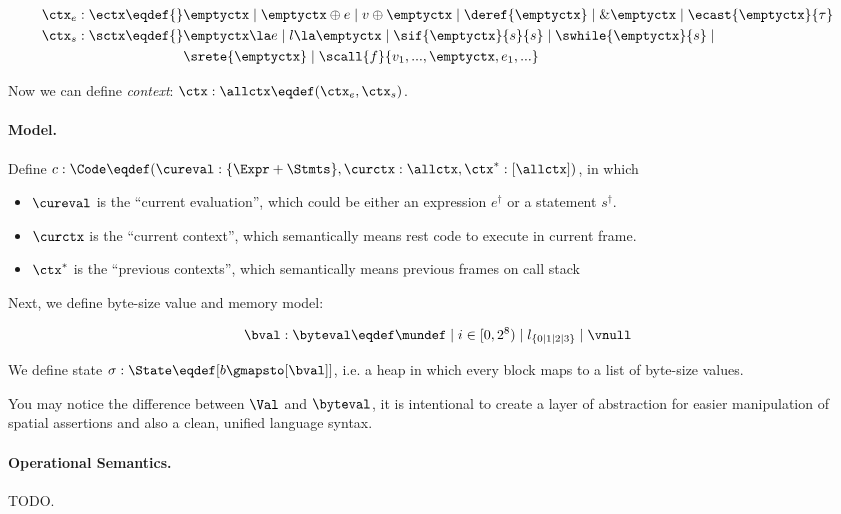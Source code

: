 \begin{align*}
    \ctx_e : \ectx \eqdef{}&
        \emptyctx \mid \emptyctx \oplus e \mid v \oplus \emptyctx \mid
        \deref{\emptyctx} \mid \& \emptyctx \mid \ecast{\emptyctx}{\tau}
\\
    \ctx_s : \sctx \eqdef{}&
        \emptyctx \la e \mid l \la \emptyctx \mid \sif{\emptyctx}{s}{s} \mid \swhile{\emptyctx}{s} \mid \\&
         \srete{\emptyctx} \mid \scall{f}{v_1, ..., \emptyctx, e_1, ...}
\end{align*}

Now we can define \emph{context}: $\ctx : \allctx \eqdef (\ctx_e, \ctx_s)$.

\paragraph{Model.}

Define $c: \Code \eqdef (\cureval: \{ \Expr + \Stmts\}, \curctx: \allctx, \ctx^{*}: [\allctx])$, in which

\begin{itemize}
\item $\cureval$ is the ``current evaluation'', which could be either an expression $e^\dag$ or a statement $s^\dag$.
\item $\curctx$ is the ``current context'', which semantically means rest code to execute in current frame.
\item $\ctx^{*}$ is the ``previous contexts'', which semantically means previous frames on call stack
\end{itemize}

Next, we define byte-size value and memory model:

\[\bval : \byteval \eqdef \mundef \mid i \in [0, 2^8) \mid l_{\{0 \mid 1 \mid 2 \mid 3\}} \mid \vnull\]

We define state $\sigma: \State \eqdef [ b \gmapsto [\bval] ]$,
i.e. a heap in which every block maps to a list of byte-size values.

You may notice the difference between $\Val$ and $\byteval$, it is intentional to create a layer of abstraction for
easier manipulation of spatial assertions and also a clean, unified language syntax.

\paragraph{Operational Semantics.}

TODO.

